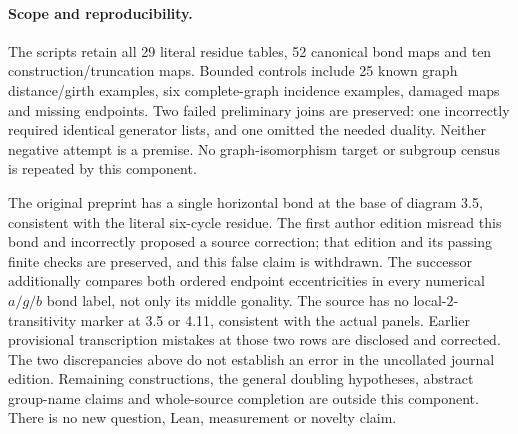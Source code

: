 \documentclass[10pt]{article}
\begin{document}
\paragraph{Scope and reproducibility.}
The scripts retain all 29 literal residue tables, 52 canonical bond maps and
ten construction/truncation maps.  Bounded controls include 25 known graph
distance/girth examples, six complete-graph incidence examples, damaged maps
and missing endpoints.  Two failed preliminary joins are preserved: one
incorrectly required identical generator lists, and one omitted the needed
duality.  Neither negative attempt is a premise.  No graph-isomorphism target
or subgroup census is repeated by this component.

The original preprint has a single horizontal bond at the base of diagram 3.5,
consistent with the literal six-cycle residue.  The first author edition
misread this bond and incorrectly proposed a source correction; that edition
and its passing finite checks are preserved, and this false claim is withdrawn.
The successor additionally compares both ordered endpoint eccentricities
in every numerical $a/g/b$ bond label, not only its middle gonality.
The source has no local-$2$-transitivity marker at 3.5 or 4.11, consistent with
the actual panels.  Earlier provisional transcription mistakes at those two
rows are disclosed and corrected.  The two discrepancies above do not
establish an error in the uncollated journal edition.  Remaining constructions,
the general doubling hypotheses, abstract group-name claims and whole-source
completion are outside this component.  There is no new question, Lean,
measurement or novelty claim.
\end{document}

